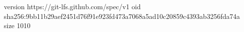 version https://git-lfs.github.com/spec/v1
oid sha256:9bb11b29aef2451d76f91e923fd473a7068a5ad10c20859c4393ab3256fda74a
size 1010
